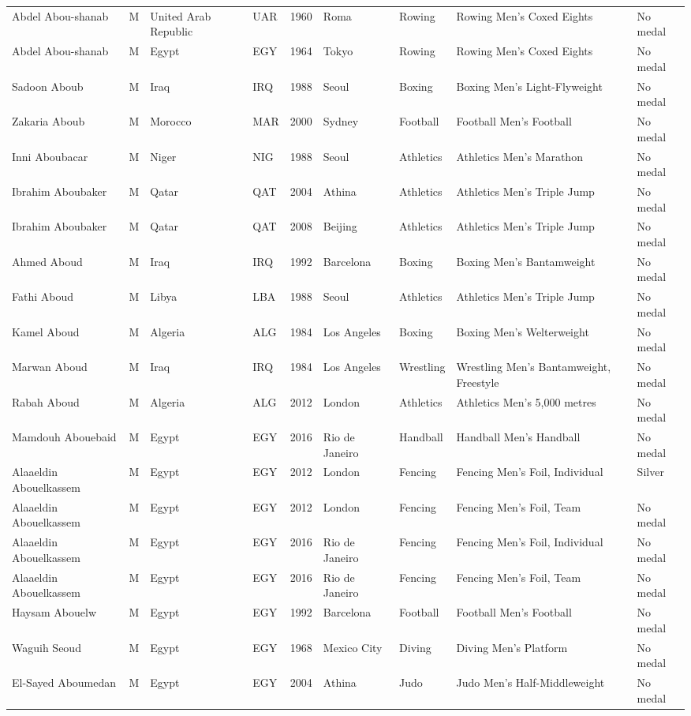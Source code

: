 \documentclass{article}%
\begin{document}
\begin{longtable}{l l l l l l l l l}
Abdel Abou{-}shanab&M&United Arab Republic&UAR&1960&Roma&Rowing&Rowing Men's Coxed Eights&No medal\\%
Abdel Abou{-}shanab&M&Egypt&EGY&1964&Tokyo&Rowing&Rowing Men's Coxed Eights&No medal\\%
Sadoon Aboub&M&Iraq&IRQ&1988&Seoul&Boxing&Boxing Men's Light{-}Flyweight&No medal\\%
Zakaria Aboub&M&Morocco&MAR&2000&Sydney&Football&Football Men's Football&No medal\\%
Inni Aboubacar&M&Niger&NIG&1988&Seoul&Athletics&Athletics Men's Marathon&No medal\\%
Ibrahim Aboubaker&M&Qatar&QAT&2004&Athina&Athletics&Athletics Men's Triple Jump&No medal\\%
Ibrahim Aboubaker&M&Qatar&QAT&2008&Beijing&Athletics&Athletics Men's Triple Jump&No medal\\%
Ahmed Aboud&M&Iraq&IRQ&1992&Barcelona&Boxing&Boxing Men's Bantamweight&No medal\\%
Fathi Aboud&M&Libya&LBA&1988&Seoul&Athletics&Athletics Men's Triple Jump&No medal\\%
Kamel Aboud&M&Algeria&ALG&1984&Los Angeles&Boxing&Boxing Men's Welterweight&No medal\\%
Marwan Aboud&M&Iraq&IRQ&1984&Los Angeles&Wrestling&Wrestling Men's Bantamweight, Freestyle&No medal\\%
Rabah Aboud&M&Algeria&ALG&2012&London&Athletics&Athletics Men's 5,000 metres&No medal\\%
Mamdouh Abouebaid&M&Egypt&EGY&2016&Rio de Janeiro&Handball&Handball Men's Handball&No medal\\%
Alaaeldin Abouelkassem&M&Egypt&EGY&2012&London&Fencing&Fencing Men's Foil, Individual&Silver\\%
Alaaeldin Abouelkassem&M&Egypt&EGY&2012&London&Fencing&Fencing Men's Foil, Team&No medal\\%
Alaaeldin Abouelkassem&M&Egypt&EGY&2016&Rio de Janeiro&Fencing&Fencing Men's Foil, Individual&No medal\\%
Alaaeldin Abouelkassem&M&Egypt&EGY&2016&Rio de Janeiro&Fencing&Fencing Men's Foil, Team&No medal\\%
Haysam Abouelw&M&Egypt&EGY&1992&Barcelona&Football&Football Men's Football&No medal\\%
Waguih Seoud&M&Egypt&EGY&1968&Mexico City&Diving&Diving Men's Platform&No medal\\%
El{-}Sayed Aboumedan&M&Egypt&EGY&2004&Athina&Judo&Judo Men's Half{-}Middleweight&No medal\\%

\end{longtable}
\end{document}
